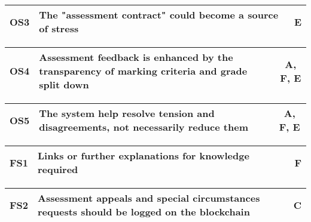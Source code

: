 \begin{table}[!ht]
	\begin{tabularx}{\textwidth}{|c|X|c|}
		\hline
		OS3 & \textbf{The "assessment contract" could become a source of stress} & E \\
		\hline
	\end{tabularx}
\end{table}

\begin{table}[!ht]
	\begin{tabularx}{\textwidth}{|c|X|c|}
		\hline
		OS4 & \textbf{Assessment feedback is enhanced by the transparency of marking criteria and grade split down} & A, F, E \\
		\hline
	\end{tabularx}
\end{table}

\begin{table}[!ht]
	\begin{tabularx}{\textwidth}{|c|X|c|}
		\hline
		OS5 & \textbf{The system help resolve tension and disagreements, not necessarily reduce them} & A, F, E \\
		\hline
	\end{tabularx}
\end{table}

\begin{table}[!ht]
	\begin{tabularx}{\textwidth}{|c|X|c|}
		\hline
		FS1 & \textbf{Links or further explanations for knowledge required} & F \\
		\hline
	\end{tabularx}
\end{table}

\begin{table}[!ht]
	\begin{tabularx}{\textwidth}{|c|X|c|}
		\hline
		FS2 & \textbf{Assessment appeals and special circumstances requests should be logged on the blockchain} & C \\
		\hline
	\end{tabularx}
\end{table}

